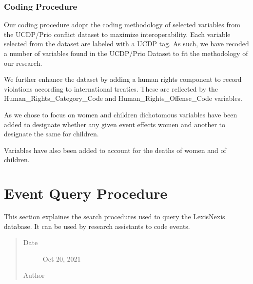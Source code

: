 \documentclass[letterpaper,10pt,english]{sphinxmanual}
\begin{document}
\subsection{Coding Procedure}
\label{\detokenize{introduction:coding-procedure}}
\sphinxAtStartPar
Our coding procedure adopt the coding methodology of selected variables from the UCDP/Prio conflict dataset to maximize interoperability.   Each variable selected from the dataset are labeled with a UCDP tag.  As such, we have recoded a number of variables found in the UCDP/Prio Dataset to fit the methodology of our research.

\sphinxAtStartPar
We further enhance the dataset by adding a human rights component to record violations according to international treaties.  These are reflected by the Human\_Rights\_Category\_Code and Human\_Rights\_Offense\_Code variables.

\sphinxAtStartPar
As we chose to focus on women and children dichotomous variables have been added to designate whether any given event effects women and another to designate the same for children.

\sphinxAtStartPar
Variables have also been added to account for the deaths of women and of children.


\chapter{Event Query Procedure}
\label{\detokenize{event_query_procedure:event-query-procedure}}\label{\detokenize{event_query_procedure:id1}}\label{\detokenize{event_query_procedure::doc}}
\begin{sphinxShadowBox}

\sphinxAtStartPar
This section explaines the search procedures used to query the Lexis\sphinxhyphen{}Nexis database. It can be used by research assistants to code events.
\begin{quote}\begin{description}
\item[{Date}] \leavevmode
\sphinxAtStartPar
Oct 20, 2021

\item[{Author}] \leavevmode
\sphinxAtStartPar
{}

\end{description}\end{quote}
\end{sphinxShadowBox}
\end{document}
